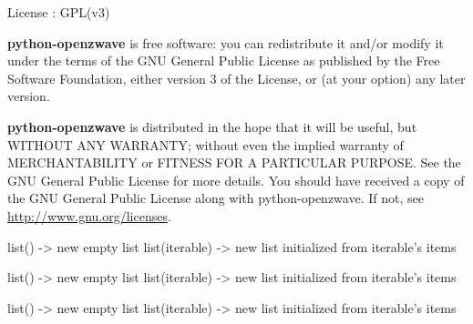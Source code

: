\documentclass[letterpaper,10pt,english]{sphinxmanual}
\begin{document}
License : GPL(v3)

\textbf{python-openzwave} is free software: you can redistribute it and/or modify
it under the terms of the GNU General Public License as published by
the Free Software Foundation, either version 3 of the License, or
(at your option) any later version.

\textbf{python-openzwave} is distributed in the hope that it will be useful,
but WITHOUT ANY WARRANTY; without even the implied warranty of
MERCHANTABILITY or FITNESS FOR A PARTICULAR PURPOSE. See the
GNU General Public License for more details.
You should have received a copy of the GNU General Public License
along with python-openzwave. If not, see \href{http://www.gnu.org/licenses}{http://www.gnu.org/licenses}.

\begin{fulllineitems}
\label{data:libopenzwave.PyNotifications}
list() -\textgreater{} new empty list
list(iterable) -\textgreater{} new list initialized from iterable's items

\end{fulllineitems}


\begin{fulllineitems}
\label{data:libopenzwave.PyGenres}
list() -\textgreater{} new empty list
list(iterable) -\textgreater{} new list initialized from iterable's items

\end{fulllineitems}


\begin{fulllineitems}
\label{data:libopenzwave.PyValueTypes}
list() -\textgreater{} new empty list
list(iterable) -\textgreater{} new list initialized from iterable's items

\end{fulllineitems}
\end{document}
